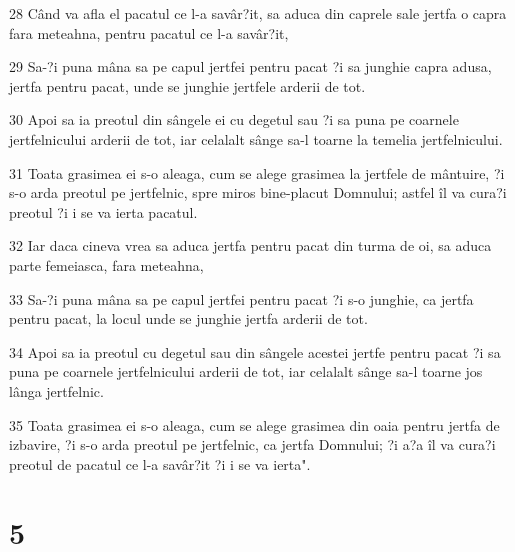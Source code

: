 \par 28 Când va afla el pacatul ce l-a savâr?it, sa aduca din caprele sale jertfa o capra fara meteahna, pentru pacatul ce l-a savâr?it,
\par 29 Sa-?i puna mâna sa pe capul jertfei pentru pacat ?i sa junghie capra adusa, jertfa pentru pacat, unde se junghie jertfele arderii de tot.
\par 30 Apoi sa ia preotul din sângele ei cu degetul sau ?i sa puna pe coarnele jertfelnicului arderii de tot, iar celalalt sânge sa-l toarne la temelia jertfelnicului.
\par 31 Toata grasimea ei s-o aleaga, cum se alege grasimea la jertfele de mântuire, ?i s-o arda preotul pe jertfelnic, spre miros bine-placut Domnului; astfel îl va cura?i preotul ?i i se va ierta pacatul.
\par 32 Iar daca cineva vrea sa aduca jertfa pentru pacat din turma de oi, sa aduca parte femeiasca, fara meteahna,
\par 33 Sa-?i puna mâna sa pe capul jertfei pentru pacat ?i s-o junghie, ca jertfa pentru pacat, la locul unde se junghie jertfa arderii de tot.
\par 34 Apoi sa ia preotul cu degetul sau din sângele acestei jertfe pentru pacat ?i sa puna pe coarnele jertfelnicului arderii de tot, iar celalalt sânge sa-l toarne jos lânga jertfelnic.
\par 35 Toata grasimea ei s-o aleaga, cum se alege grasimea din oaia pentru jertfa de izbavire, ?i s-o arda preotul pe jertfelnic, ca jertfa Domnului; ?i a?a îl va cura?i preotul de pacatul ce l-a savâr?it ?i i se va ierta".

\chapter{5}

